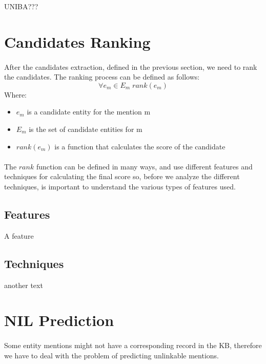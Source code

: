 UNIBA???

\section{Candidates Ranking}
\paragraph{}
After the candidates extraction, defined in the previous section, we need to rank the candidates. The ranking process can be defined as follows:
\[\forall e_m \in E_m \; rank(e_m)\]
Where:

\begin{itemize}[noitemsep,  topsep=10pt]
\item $e_m$ is a candidate entity for the mention m
\item $E_m$ is the set of candidate entities for m
\item $rank(e_m)$ is a function that calculates the score of the candidate
\end{itemize}

\paragraph{}
The $rank$ function can be defined in many ways, and use different features and techniques for calculating the final score so, before we analyze the different techniques, is important to understand the various types of features used.

\subsection{Features}
A feature

\subsection{Techniques} 
another text

\section{NIL Prediction}
\paragraph{}
Some entity mentions might not have a corresponding record in the KB, therefore we have to deal with the problem of predicting unlinkable mentions. 